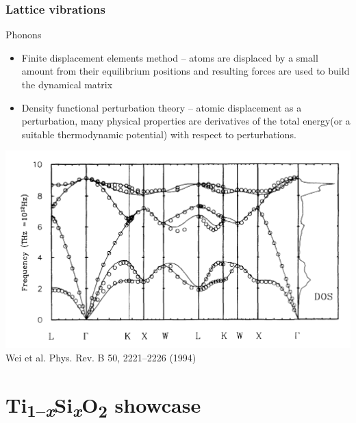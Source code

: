 \documentclass[noamsthm,8pt,t,xcolor={dvipsnames}]{beamer}
\def\TiSiO{Ti\textsubscript{1--\itshape x}Si\textsubscript{\itshape x}O\textsubscript{2}}
\begin{document}
\begin{frame}
   \frametitle{Lattice vibrations}
   \begin{block}{Phonons}
      \begin{itemize}
         \item Finite displacement elements method -- atoms are displaced by a small amount from their equilibrium positions and resulting forces are used to build the dynamical matrix
         \item Density functional perturbation theory -- atomic displacement as a perturbation, many physical properties are derivatives of the total energy(or a suitable thermodynamic potential) with respect to perturbations.
      \end{itemize}
   \end{block}
   \begin{center}
      \includegraphics[width=0.65\linewidth]{figures/phonons.png}\\
      {\scriptsize Wei et al. Phys. Rev. B 50, 2221--2226 (1994)}\\   
   \end{center}
\end{frame}

\section{\TiSiO{} showcase}
\end{document}
